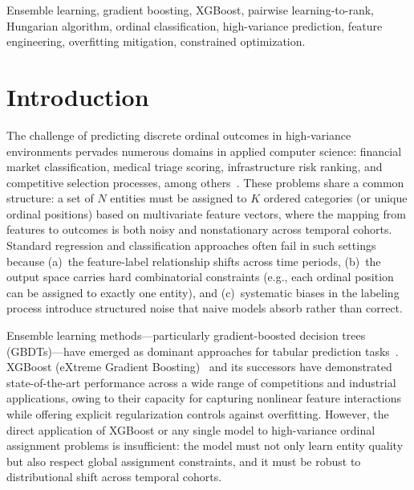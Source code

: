 \documentclass[conference]{IEEEtran}
\begin{document}
\begin{IEEEkeywords}
Ensemble learning, gradient boosting, XGBoost, pairwise learning-to-rank, Hungarian algorithm, ordinal classification, high-variance prediction, feature engineering, overfitting mitigation, constrained optimization.
\end{IEEEkeywords}

\section{Introduction}

The challenge of predicting discrete ordinal outcomes in high-variance environments pervades numerous domains in applied computer science: financial market classification, medical triage scoring, infrastructure risk ranking, and competitive selection processes, among others~\cite{gutierrez2016ordinal}. These problems share a common structure: a set of $N$ entities must be assigned to $K$ ordered categories (or unique ordinal positions) based on multivariate feature vectors, where the mapping from features to outcomes is both noisy and nonstationary across temporal cohorts. Standard regression and classification approaches often fail in such settings because (a)~the feature-label relationship shifts across time periods, (b)~the output space carries hard combinatorial constraints (e.g., each ordinal position can be assigned to exactly one entity), and (c)~systematic biases in the labeling process introduce structured noise that naive models absorb rather than correct.

Ensemble learning methods---particularly gradient-boosted decision trees (GBDTs)---have emerged as dominant approaches for tabular prediction tasks~\cite{shwartzziv2022tabular, grinsztajn2022tree}. XGBoost (eXtreme Gradient Boosting)~\cite{chen2016xgboost} and its successors have demonstrated state-of-the-art performance across a wide range of competitions and industrial applications, owing to their capacity for capturing nonlinear feature interactions while offering explicit regularization controls against overfitting. However, the direct application of XGBoost or any single model to high-variance ordinal assignment problems is insufficient: the model must not only learn entity quality but also respect global assignment constraints, and it must be robust to distributional shift across temporal cohorts.
\end{document}
